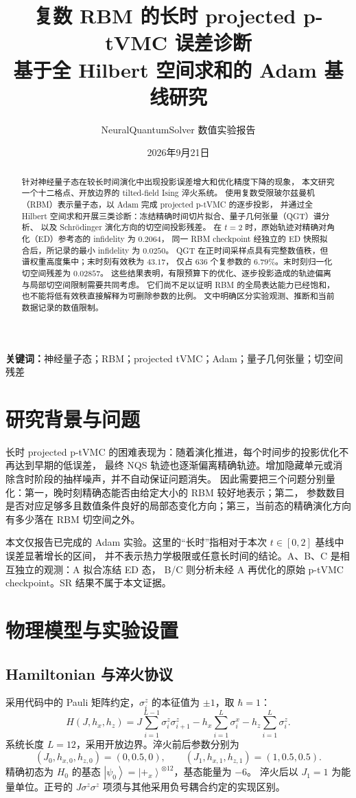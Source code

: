 \documentclass[UTF8,a4paper,11pt,fontset=fandol]{ctexart}
\title{复数 RBM 的长时 projected p-tVMC 误差诊断\\
\large 基于全 Hilbert 空间求和的 Adam 基线研究}
\author{NeuralQuantumSolver 数值实验报告}
\date{2026年9月21日}
\newcommand{\ket}[1]{\left|#1\right\rangle}
\begin{document}
\maketitle
\begin{abstract}
针对神经量子态在较长时间演化中出现投影误差增大和优化精度下降的现象，
本文研究一个十二格点、开放边界的 tilted-field Ising 淬火系统。
使用复数受限玻尔兹曼机（RBM）表示量子态，以 Adam 完成 projected p-tVMC 的逐步投影，
并通过全 Hilbert 空间求和开展三类诊断：冻结精确时间切片拟合、量子几何张量（QGT）谱分析、
以及 Schrödinger 演化方向的切空间投影残差。
在 $t=2$ 时，原始轨迹对精确对角化（ED）参考态的 infidelity 为 $0.2064$，
同一 RBM checkpoint 经独立的 ED 快照拟合后，所记录的最小 infidelity 为 $0.0250$。
QGT 在正时间采样点具有完整数值秩，但谱权重高度集中；末时刻有效秩为 $43.17$，
仅占 $636$ 个复参数的 $6.79\%$。末时刻归一化切空间残差为 $0.02857$。
这些结果表明，有限预算下的优化、逐步投影造成的轨迹偏离与局部切空间限制需要共同考虑。
它们尚不足以证明 RBM 的全局表达能力已经饱和，也不能将低有效秩直接解释为可删除参数的比例。
文中明确区分实验观测、推断和当前数据记录的数值限制。
\end{abstract}
\noindent\textbf{关键词：}神经量子态；RBM；projected tVMC；Adam；量子几何张量；切空间残差

\section{研究背景与问题}
长时 projected p-tVMC 的困难表现为：随着演化推进，每个时间步的投影优化不再达到早期的低误差，
最终 NQS 轨迹也逐渐偏离精确轨迹。增加隐藏单元或消除含时阶段的抽样噪声，并不自动保证问题消失。
因此需要把三个问题分别量化：第一，晚时刻精确态能否由给定大小的 RBM 较好地表示；第二，
参数数目是否对应足够多且数值条件良好的局部态变化方向；第三，当前态的精确演化方向有多少落在 RBM 切空间之外。

本文仅报告已完成的 Adam 实验。这里的“长时”指相对于本次 $t\in[0,2]$ 基线中误差显著增长的区间，
并不表示热力学极限或任意长时间的结论。A、B、C 是相互独立的观测：A 拟合冻结 ED 态，
B/C 则分析未经 A 再优化的原始 p-tVMC checkpoint。SR 结果不属于本文证据。

\section{物理模型与实验设置}
\subsection{Hamiltonian 与淬火协议}
采用代码中的 Pauli 矩阵约定，$\sigma_i^z$ 的本征值为 $\pm1$，取 $\hbar=1$：
\begin{equation}
H(J,h_x,h_z)=J\sum_{i=1}^{L-1}\sigma_i^z\sigma_{i+1}^z
-h_x\sum_{i=1}^{L}\sigma_i^x-h_z\sum_{i=1}^{L}\sigma_i^z.
\label{eq:hamiltonian}
\end{equation}
系统长度 $L=12$，采用开放边界。淬火前后参数分别为
\begin{equation}
(J_0,h_{x,0},h_{z,0})=(0,0.5,0),\qquad
(J_1,h_{x,1},h_{z,1})=(1,0.5,0.5).
\end{equation}
精确初态为 $H_0$ 的基态 $\ket{\psi_0}=\ket{+_x}^{\otimes12}$，基态能量为 $-6$。
淬火后以 $J_1=1$ 为能量单位。正号的 $J\sigma^z\sigma^z$ 项须与其他采用负号耦合约定的实现区别。
\end{document}
